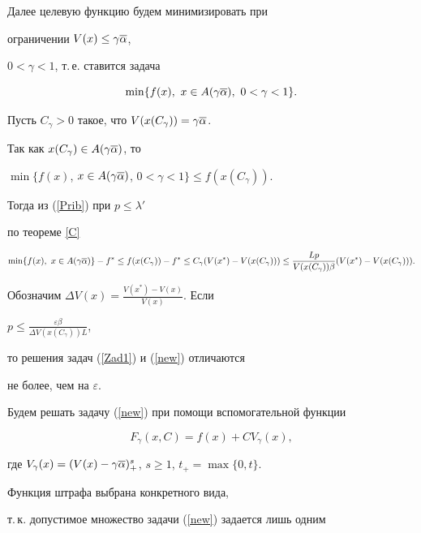 Далее целевую функцию будем минимизировать при 


ограничении $V(x)\leq\gamma \overline\alpha$,


$0<\gamma<1$, т.\,е. ставится задача


\begin{equation}\label{new}


\min\{f(x),\ x\in A(\gamma \o\alpha),\ 0<\gamma<1\}.


\end{equation}





Пусть $C_\gamma>0$ такое, что $V(x(C_\gamma))=\gamma \overline\alpha$.


Так как $x(C_\gamma)\in A(\gamma\overline\alpha)$, то 


$\min \{f(x)$, $x\in A(\gamma \overline\alpha)$, $0<\gamma<1\}\leq f(x(C_\gamma))$.


Тогда из (\ref{Prib}) при $p\leq\lambda'$


по теореме \ref{C}


$$


\min\{f(x),\ x\in A(\gamma \o\alpha)\}-f^*\leq


f(x(C_\gamma))-f^*\leq C_\gamma(V(x^*)-V(x(C_\gamma)))\leq


\frac{Lp}{V(x(C_\gamma))\beta}(V(x^*)-V(x(C_\gamma))).


$$


Обозначим $\Delta V(x)=\frac{V(x^*)-V(x)}{V(x)}$. Если 


$p\leq\frac{\varepsilon\beta}{\Delta V(x(C_\gamma))L}$,


то решения задач (\ref{Zad1}) и (\ref{new}) отличаются 


не более, чем на $\varepsilon$.





Будем решать задачу (\ref{new}) при помощи вспомогательной функции


\begin{equation}\label{Fi}


F_\gamma(x,C)=f(x)+CV_\gamma(x),


\end{equation}


где $V_\gamma(x)=(V(x)-\gamma \overline\alpha)_+^s$, $s\geq 1$, $t_+=\max\{0,t\}$.


Функция штрафа выбрана конкретного вида, 


т.\,к. допустимое множество задачи (\ref{new}) задается лишь одним 



